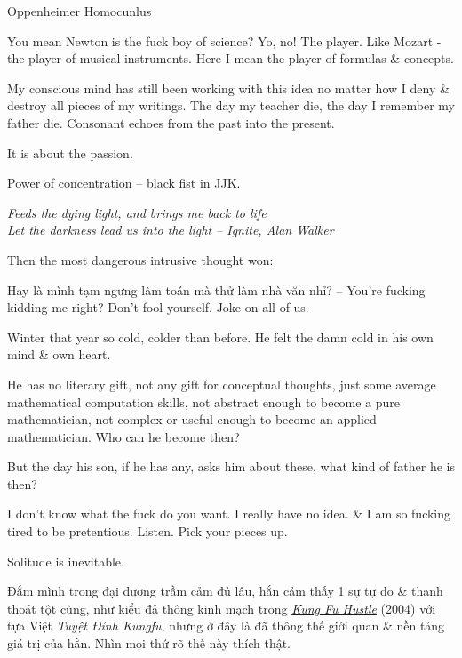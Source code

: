 \documentclass[12pt]{article}
\begin{document}
\cite{Tolle2022}

Oppenheimer Homocunlus

You mean Newton is the fuck boy of science? Yo, no! The player. Like Mozart - the player of musical instruments. Here I mean the player of formulas \& concepts.

My conscious mind has still been working with this idea no matter how I deny \& destroy all pieces of my writings. The day my teacher die, the day I remember my father die. Consonant echoes from the past into the present. 

It is about the passion.

Power of concentration -- black fist in JJK.

\begin{center}\it
	Feeds the dying light, and brings me back to life\\
	Let the darkness lead us into the light 
	-- Ignite, {\sc Alan Walker}
\end{center}
Then the most dangerous intrusive thought won:

Hay là mình tạm ngưng làm toán mà thử làm nhà văn nhỉ? -- You're fucking kidding me right? Don't fool yourself. Joke on all of us.

Winter that year so cold, colder than before. He felt the damn cold in his own mind \& own heart.

He has no literary gift, not any gift for conceptual thoughts, just some average mathematical computation skills, not abstract enough to become a pure mathematician, not complex or useful enough to become an applied mathematician. Who can he become then?

But the day his son, if he has any, asks him about these, what kind of father he is then?

I don't know what the fuck do you want. I really have no idea. \& I am so fucking tired to be pretentious. Listen. Pick your pieces up.

Solitude is inevitable.

Đắm mình trong đại dương trầm cảm đủ lâu, hắn cảm thấy 1 sự tự do \& thanh thoát tột cùng, như kiểu đả thông kinh mạch trong \href{https://www.imdb.com/title/tt0373074/}{\it Kung Fu Hustle} (2004) với tựa Việt {\it Tuyệt Đỉnh Kungfu}, nhưng ở đây là đã thông thế giới quan \& nền tảng giá trị của hắn. Nhìn mọi thứ rõ thế này thích thật.
\end{document}
